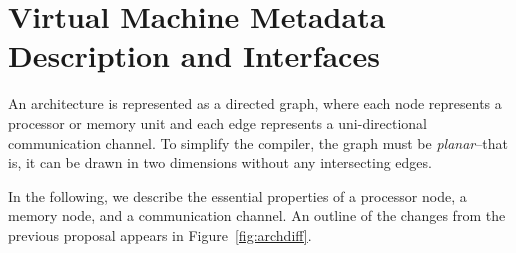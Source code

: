 \newcommand{\taba}[1]{\parbox{2.4in}{ ~ \vspace{-0pt} \\ #1 \vspace{-6pt} \\ }}
\newcommand{\tabb}[1]{\parbox{3.6in}{ ~ \vspace{-0pt} \\ #1 \vspace{-6pt} \\ }}
\newcommand{\mytable}[2]{
  {\small
    \begin{tabular}{|l|l|} \hline
      Attribute Name & #1 \\
      \hline \hline
      #2
    \end{tabular}
  }
}
\newcommand{\enttable}[1]{\mytable{Type - Units / Interpretation}{#1}}
\newcommand{\sumtable}[1]{\mytable{Summary}{#1}}
\newcommand{\justtable}[1]{\mytable{Summary and Justification}{#1}}
\newcommand{\entry}[3]{\taba{#1} & \tabb{#2 \\ #3} \\ \hline}
\newcommand{\summary}[2]{\taba{#1} & \tabb{#2} \\ \hline}
\newcommand{\just}[3]{\taba{#1} & \tabb{#2 \\ {\it #3}} \\ \hline}

\section{Virtual Machine Metadata Description and Interfaces}

An architecture is represented as a directed graph, where each node
represents a processor or memory unit and each edge represents a
uni-directional communication channel.  To simplify the compiler, the
graph must be {\it planar}--that is, it can be drawn in two dimensions
without any intersecting edges.

In the following, we describe the essential properties of a processor
node, a memory node, and a communication channel.  An outline of the
changes from the previous proposal appears in
Figure~\ref{fig:archdiff}.

